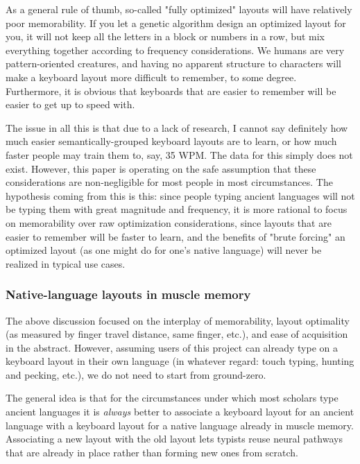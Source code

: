 \documentclass[11pt]{article}
\begin{document}
As a general rule of thumb, so-called "fully optimized" layouts will have relatively poor memorability. If you let a genetic algorithm design an optimized layout for you, it will not keep all the letters in a block or numbers in a row, but mix everything together according to frequency considerations. We humans are very pattern-oriented creatures, and having no apparent structure to characters will make a keyboard layout more difficult to remember, to some degree. Furthermore, it is obvious that keyboards that are easier to remember will be easier to get up to speed with.

The issue in all this is that due to a lack of research, I cannot say definitely how much easier semantically-grouped keyboard layouts are to learn, or how much faster people may train them to, say, 35 WPM. The data for this simply does not exist. However, this paper is operating on the safe assumption that these considerations are non-negligible for most people in most circumstances. The hypothesis coming from this is this: since people typing ancient languages will not be typing them with great magnitude and frequency, it is more rational to focus on memorability over raw optimization considerations, since layouts that are easier to remember will be faster to learn, and the benefits of "brute forcing" an optimized layout (as one might do for one's native language) will never be realized in typical use cases.

\subsubsection{Native-language layouts in muscle memory}
\label{sec:org0109ff2}

The above discussion focused on the interplay of memorability, layout optimality (as measured by finger travel distance, same finger, etc.), and ease of acquisition in the abstract. However, assuming users of this project can already type on a keyboard layout in their own language (in whatever regard: touch typing, hunting and pecking, etc.), we do not need to start from ground-zero.

The general idea is that for the circumstances under which most scholars type ancient languages it is \emph{always} better to associate a keyboard layout for an ancient language with a keyboard layout for a native language already in muscle memory. Associating a new layout with the old layout lets typists reuse neural pathways that are already in place rather than forming new ones from scratch.
\end{document}
